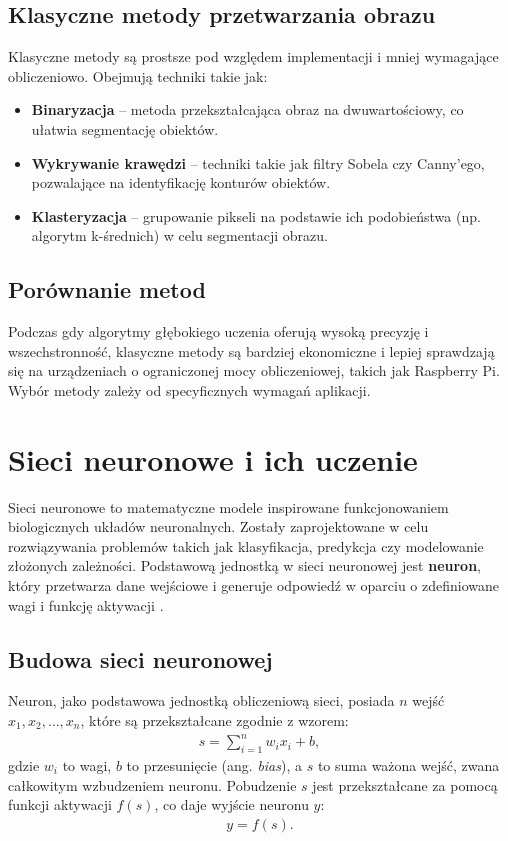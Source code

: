 \documentclass[a4paper,twoside,12pt]{book}
\begin{document}
\subsection{Klasyczne metody przetwarzania obrazu}
Klasyczne metody są prostsze pod względem implementacji i mniej wymagające obliczeniowo. Obejmują techniki takie jak:
\begin{itemize}
    \item \textbf{Binaryzacja} – metoda przekształcająca obraz na dwuwartościowy, co ułatwia segmentację obiektów.
    \item \textbf{Wykrywanie krawędzi} – techniki takie jak filtry Sobela czy Canny'ego, pozwalające na identyfikację konturów obiektów.
    \item \textbf{Klasteryzacja} – grupowanie pikseli na podstawie ich podobieństwa (np. algorytm k-średnich) w celu segmentacji obrazu.
\end{itemize}

\subsection{Porównanie metod}
Podczas gdy algorytmy głębokiego uczenia oferują wysoką precyzję i wszechstronność, klasyczne metody są bardziej ekonomiczne i lepiej sprawdzają się na urządzeniach o ograniczonej mocy obliczeniowej, takich jak Raspberry Pi. Wybór metody zależy od specyficznych wymagań aplikacji.

\section{Sieci neuronowe i ich uczenie}
Sieci neuronowe to matematyczne modele inspirowane funkcjonowaniem biologicznych układów neuronalnych. Zostały zaprojektowane w celu rozwiązywania problemów takich jak klasyfikacja, predykcja czy modelowanie złożonych zależności. Podstawową jednostką w sieci neuronowej jest \textbf{neuron}, który przetwarza dane wejściowe i generuje odpowiedź w oparciu o zdefiniowane wagi i funkcję aktywacji \cite{bib:bielecki}.

\subsection{Budowa sieci neuronowej}
Neuron, jako podstawowa jednostką obliczeniową sieci, posiada \(n\) wejść \(x_1, x_2, \ldots, x_n\), które są przekształcane zgodnie z wzorem:
\begin{align}
    s = \sum_{i=1}^n w_i x_i + b,
\end{align}
gdzie \(w_i\) to wagi, \(b\) to przesunięcie (ang. \textit{bias}), a \(s\) to suma ważona wejść, zwana całkowitym wzbudzeniem neuronu. Pobudzenie \(s\) jest przekształcane za pomocą funkcji aktywacji \(f(s)\), co daje wyjście neuronu \(y\):
\begin{align}
    y = f(s).
\end{align}
\end{document}
